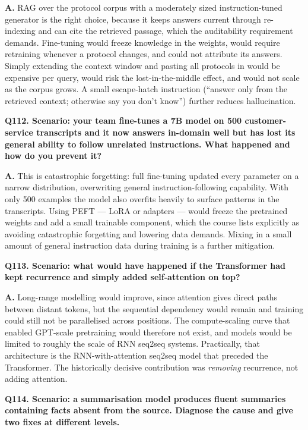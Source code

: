 \documentclass[11pt]{article}
\begin{document}
\noindent\textbf{A.} RAG over the protocol corpus with a moderately sized instruction-tuned generator is the right choice, because it keeps answers current through re-indexing and can cite the retrieved passage, which the auditability requirement demands. Fine-tuning would freeze knowledge in the weights, would require retraining whenever a protocol changes, and could not attribute its answers. Simply extending the context window and pasting all protocols in would be expensive per query, would risk the lost-in-the-middle effect, and would not scale as the corpus grows. A small escape-hatch instruction (``answer only from the retrieved context; otherwise say you don't know'') further reduces hallucination.

\medskip
\noindent\textbf{Q112. Scenario: your team fine-tunes a 7B model on 500 customer-service transcripts and it now answers in-domain well but has lost its general ability to follow unrelated instructions. What happened and how do you prevent it?}

\noindent\textbf{A.} This is catastrophic forgetting: full fine-tuning updated every parameter on a narrow distribution, overwriting general instruction-following capability. With only 500 examples the model also overfits heavily to surface patterns in the transcripts. Using PEFT --- LoRA or adapters --- would freeze the pretrained weights and add a small trainable component, which the course lists explicitly as avoiding catastrophic forgetting and lowering data demands. Mixing in a small amount of general instruction data during training is a further mitigation.

\medskip
\noindent\textbf{Q113. Scenario: what would have happened if the Transformer had kept recurrence and simply added self-attention on top?}

\noindent\textbf{A.} Long-range modelling would improve, since attention gives direct paths between distant tokens, but the sequential dependency would remain and training could still not be parallelised across positions. The compute-scaling curve that enabled GPT-scale pretraining would therefore not exist, and models would be limited to roughly the scale of RNN seq2seq systems. Practically, that architecture is the RNN-with-attention seq2seq model that preceded the Transformer. The historically decisive contribution was \emph{removing} recurrence, not adding attention.

\medskip
\noindent\textbf{Q114. Scenario: a summarisation model produces fluent summaries containing facts absent from the source. Diagnose the cause and give two fixes at different levels.}
\end{document}
